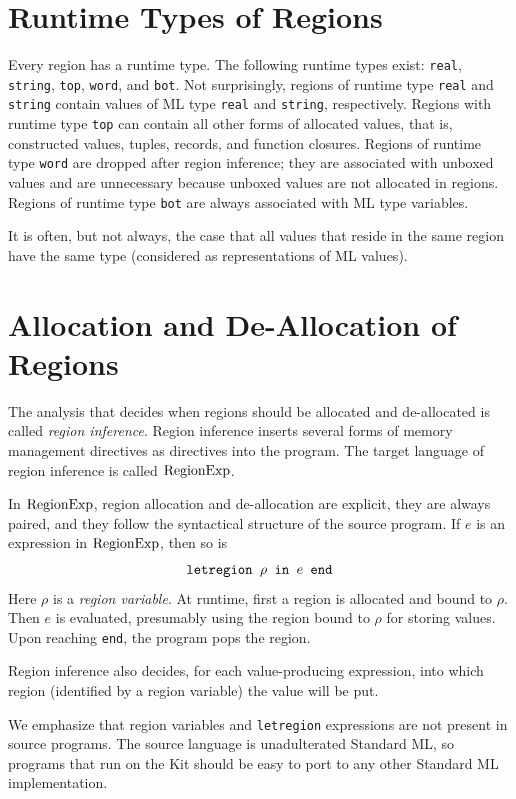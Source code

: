 \documentclass[12pt]{book}
\begin{document}
\section{Runtime Types of Regions}
\label{runtimetypes.sec}
Every region has a 
%
runtime type. The following runtime types exist: {\tt real}, {\tt
  string}, {\tt top}, {\tt word}, and {\tt bot}. Not surprisingly,
regions of runtime type {\tt real} and {\tt string} contain values of
ML type {\tt real} and {\tt string}, respectively.  Regions with
runtime type {\tt top} can contain all other forms of allocated
values, that is, constructed values, tuples, records, and function
closures. Regions of runtime type {\tt word} are dropped after region
inference; they are associated with unboxed values and are unnecessary
because unboxed values are not allocated in regions. Regions of
runtime type {\tt bot} are always associated with ML type variables.

It is often, but not always, the case that all values that reside in
the same region have the same type (considered as representations of
ML values).
 
\section{Allocation and De-Allocation of Regions}
\label{aldeal.sec}
The analysis that decides when regions should be allocated and
de-allocated is called {\em region inference}. Region inference
inserts several forms of memory management directives as directives
into the program.  The target language of region inference is called
%
$\hbox{\rm RegionExp}$.

In $\hbox{\rm RegionExp}$, region allocation and de-allocation are explicit, they
are always paired, and they follow the syntactical structure of the
source program.  If $e$ is an expression in $\hbox{\rm RegionExp}$, then so is
%
$$\hbox{\tt letregion $\rho$ in $e$ end}$$
Here $\rho$ is a 
%
{\em region variable}. At runtime, first a region is allocated and
bound to $\rho$. Then $e$ is evaluated, presumably using the region
bound to $\rho$ for storing values. Upon reaching {\tt end}, the
program pops the region.

Region inference also decides, for each value-producing expression,
into which region (identified by a region variable) the value will be
put.

We emphasize that region variables and {\tt letregion} expressions are
not present in source programs. The source language is unadulterated
Standard ML, so programs that run on the Kit should be easy to port to
any other Standard ML implementation.
\end{document}
